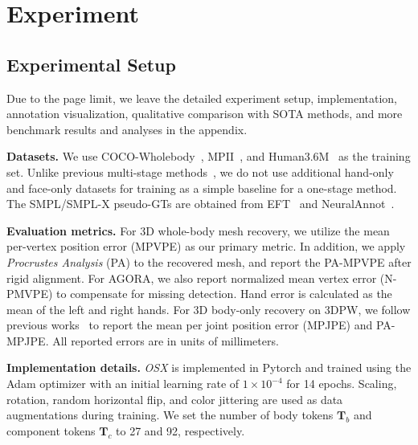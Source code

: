 \documentclass[10pt,twocolumn,letterpaper]{article}
\newcommand{\modelname}{\emph{OSX}\xspace}
\begin{document}
 \vspace{0.1cm}
\section{Experiment}
\label{sec:exp}


\subsection{Experimental Setup}
Due to the page limit, we leave the detailed experiment setup, implementation, annotation visualization, qualitative comparison with SOTA methods, and more benchmark results and analyses in the appendix.

\noindent\textbf{Datasets.}
We use COCO-Wholebody~\cite{jin2020wholebody}, MPII~\cite{andriluka2014mpii}, and Human3.6M~\cite{Ionescu_2014_hm36} as the training set. Unlike previous multi-stage methods~\cite{PavlakosGeorgios2020expose, GyeongsikMoon2020hand4whole}, we do not use additional hand-only and face-only datasets for training as a simple baseline for a one-stage method. The SMPL/SMPL-X pseudo-GTs are obtained from EFT~\cite{joo2020exemplar} and NeuralAnnot~\cite{Moon_2022NeuralAnnot}. 

\noindent\textbf{Evaluation metrics.}
For 3D whole-body mesh recovery, we utilize the mean per-vertex position error (MPVPE) as our primary metric. In addition, we apply \emph{Procrustes Analysis} (PA) to the recovered mesh, and report the PA-MPVPE after rigid alignment. For AGORA, we also report normalized mean vertex error (N-PMVPE) to compensate for missing detection. Hand error is calculated as the mean of the left and right hands.
For 3D body-only recovery on 3DPW, we follow previous works~\cite{zeng2022deciwatch,Kolotouros_2019_spin} to report the mean per joint position error (MPJPE) and PA-MPJPE. 
All reported errors are in units of millimeters.

\noindent \textbf{Implementation details.}
\modelname is implemented in Pytorch and trained using the Adam optimizer with an initial learning rate of $1\times 10^{-4}$ for 14 epochs. Scaling, rotation, random horizontal flip, and color jittering are used as data augmentations during training. We set the number of body tokens $\mathbf{T}_b$ and component tokens $\mathbf{T}_c$ to 27 and 92, respectively. 
\end{document}
